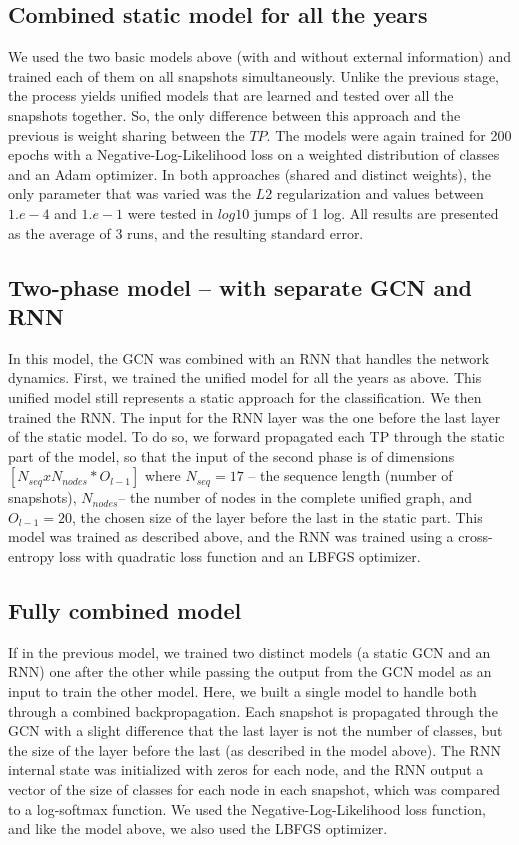 \subsection{Combined static model for all the years}
We used the two basic models above (with and without external information) and trained each of them on all snapshots simultaneously. Unlike the previous stage, the process yields unified models that are learned and tested over all the snapshots together. So, the only difference between this approach and the previous is weight sharing between the $TP$. The models were again trained for 200 epochs with a Negative-Log-Likelihood loss on a weighted distribution of classes and an Adam optimizer. In both approaches (shared and distinct weights), the only parameter that was varied was the $L2$ regularization and values between $1.e-4$ and $1.e-1$ were tested in $log10$ jumps of 1 log. All results are presented as the average of 3 runs, and the resulting standard error.

\subsection{ Two-phase model – with separate GCN and RNN}
In this model, the GCN was combined with an RNN that handles the network dynamics. First, we trained the unified model for all the years as above. This unified model still represents a static approach for the classification. We then trained the RNN. The input for the RNN layer was the one before the last layer of the static model. To do so, we forward propagated each TP through the static part of the model, so that the input of the second phase is of dimensions $[N_{seq}xN_{nodes}*O_{l-1}]$ where $N_{seq}=17$ – the sequence length (number of snapshots), $N_{nodes}$– the number of nodes in the complete unified graph, and $O_{l-1}=20$, the chosen size of the layer before the last in the static part. This model was trained as described above, and the RNN was trained using a cross-entropy loss with quadratic loss function and an LBFGS optimizer.

\subsection{Fully combined model}
If in the previous model, we trained two distinct models (a static GCN and an RNN) one after the other while passing the output from the GCN model as an input to train the other model. Here, we built a single model to handle both through a combined backpropagation. Each snapshot is propagated through the GCN with a slight difference that the last layer is not the number of classes, but the size of the layer before the last (as described in the model above). The RNN internal state was initialized with zeros for each node, and the RNN output a vector of the size of classes for each node in each snapshot, which was compared to a log-softmax function. We used the Negative-Log-Likelihood loss function, and like the model above, we also used the LBFGS optimizer.

